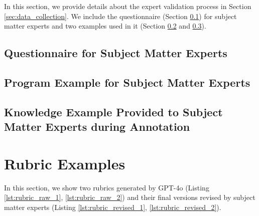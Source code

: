 In this section, we provide details about the expert validation process in Section \ref{sec:data_collection}.
We include the questionnaire (Section \ref{app:questionnaire}) for subject matter experts and two examples used in it (Section \ref{app:program_example} and \ref{app:knowledge_example}).

\subsection{Questionnaire for Subject Matter Experts}
\label{app:questionnaire}



\newpage
\subsection{Program Example for Subject Matter Experts}
\label{app:program_example}



\newpage
\subsection{Knowledge Example Provided to Subject Matter Experts during Annotation}
\label{app:knowledge_example}



\newpage
\setcounter{table}{0}
\renewcommand\thetable{\Alph{section}.\arabic{table}}
\setcounter{figure}{0}
\renewcommand\thefigure{\Alph{section}.\arabic{figure}}
\setcounter{lstlisting}{0}
\renewcommand\thelstlisting{\Alph{section}.\arabic{lstlisting}}

\section{Rubric Examples}
\label{app:rubrics}

In this section, we show two rubrics generated by GPT-4o (Listing \ref{lst:rubric_raw_1}, \ref{lst:rubric_raw_2}) and their final versions revised by subject matter experts (Listing \ref{lst:rubric_revised_1}, \ref{lst:rubric_revised_2}).

